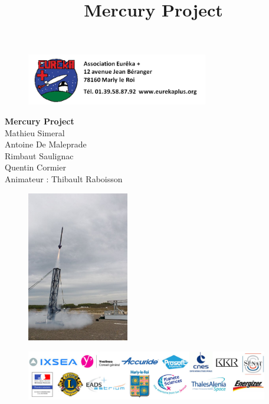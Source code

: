 \documentclass[a4paper,12pt]{scrartcl}
\title{Mercury Project}
\begin{document}
  
    \thispagestyle{empty}
    \begin{figure}[H]\includegraphics[height=85px, width=300px]{Photos_Mercury/eurekapluslogo.jpg}\end{figure}


    \begin{center}
      \Huge{\bf{Mercury Project}} \\
      \small{
      Mathieu Simeral\\Antoine De Maleprade\\Rimbaut Saulignac\\Quentin Cormier\\

      Animateur : Thibault Raboisson
      }
    \end{center}

    \begin{figure}[H]
		\begin{center}
		    \includegraphics[height=250px, width=168px]{Photos_Mercury/decollage.jpg}
		\end{center}
    \end{figure}


    \begin{figure}[H]
      \begin{center}
	\includegraphics[height=81px, width=400px]{Photos_Mercury/eurekaplus_partenaires_2010.jpg}
      \end{center}
    \end{figure}	
\end{document}
